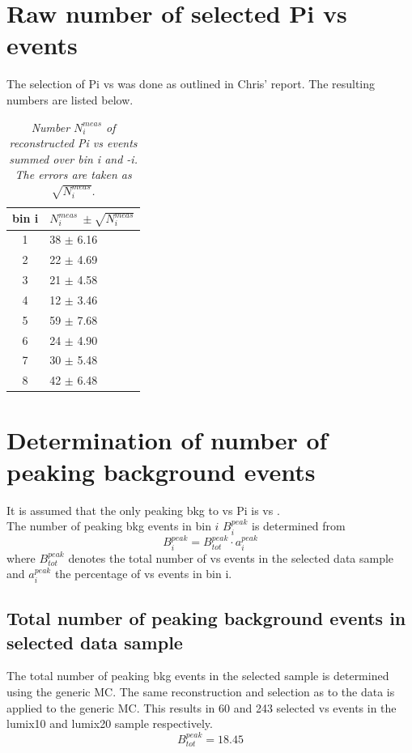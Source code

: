 \section{Raw number of selected \4Pi vs \KsPiPi events }
The selection of \4Pi vs \KsPiPi was done as outlined in Chris' report. The resulting numbers are listed below.\\
\begin{table}[!h]
	\begin{center}
	\begin{tabular}{c| l}
		bin i & $N^{meas}_i\ \pm \sqrt{N^{meas}_i}$  \\
		\hline 
		\hline
1 & 38 $\pm$ 6.16 \\ 
2 & 22 $\pm$ 4.69 \\ 
3 & 21 $\pm$ 4.58 \\ 
4 & 12 $\pm$ 3.46 \\ 
5 & 59 $\pm$ 7.68 \\ 
6 & 24 $\pm$ 4.90  \\ 
7 & 30 $\pm$ 5.48 \\ 
8 & 42 $\pm$ 6.48 \\ 
\end{tabular}
\end{center}
\caption{\textit{Number $N^{meas}_i$ of reconstructed \4Pi vs \KsPiPi events summed over bin i and -i. The errors are taken as $\sqrt{N^{meas}_i}$.}}
\end{table}


\section{Determination of number of peaking background events}
It is assumed that the only peaking bkg to \KsPiPi vs \4Pi is \KsPiPi vs \KsPiPi .\\
The number of peaking bkg events in bin $i$ $B_i^{peak}$ is determined from
\begin{equation}
B_i^{peak} = B_{tot}^{peak} \cdot a_i^{peak}
\end{equation}
where $B_{tot}^{peak}$ denotes the total number of \KsPiPi vs \KsPiPi events in the selected data sample and $a_i^{peak}$ the percentage of \KsPiPi vs \KsPiPi events in bin i.\\

\subsection{Total number of peaking background events in selected data sample}
The total number of peaking bkg events in the selected sample is determined using the generic MC. The same reconstruction and selection as to the data is applied to the generic MC. This results in 60 and 243 selected \KsPiPi vs \KsPiPi events in the lumix10 and lumix20 sample respectively.
\begin{equation}
B_{tot}^{peak}  = 18.45 
\end{equation}

